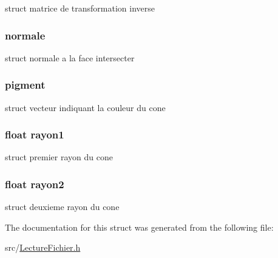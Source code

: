 \label{structcone_acd7a3590501dcccfaefccbb658f83821}
struct matrice de transformation inverse \hypertarget{structcone_a944738f40a0294270a0047acc5a77ee2}{
\subsubsection[{normale}]{ {\bf normale}}}
\label{structcone_a944738f40a0294270a0047acc5a77ee2}
struct normale a la face intersecter \hypertarget{structcone_a5a4ee24431a1811fa1c8b75844198987}{
\subsubsection[{pigment}]{ {\bf pigment}}}
\label{structcone_a5a4ee24431a1811fa1c8b75844198987}
struct vecteur indiquant la couleur du cone \hypertarget{structcone_a1b8e70708fd2b25f83f0aacadbe0ddbd}{
\subsubsection[{rayon1}]{\setlength{\rightskip}{0pt plus 5cm}float {\bf rayon1}}}
\label{structcone_a1b8e70708fd2b25f83f0aacadbe0ddbd}
struct premier rayon du cone \hypertarget{structcone_a8630bec8bf19ad824e1527744e48178e}{
\subsubsection[{rayon2}]{\setlength{\rightskip}{0pt plus 5cm}float {\bf rayon2}}}
\label{structcone_a8630bec8bf19ad824e1527744e48178e}
struct deuxieme rayon du cone 

The documentation for this struct was generated from the following file:\begin{DoxyCompactItemize}
\item 
src/\hyperlink{_lecture_fichier_8h}{LectureFichier.h}\end{DoxyCompactItemize}
